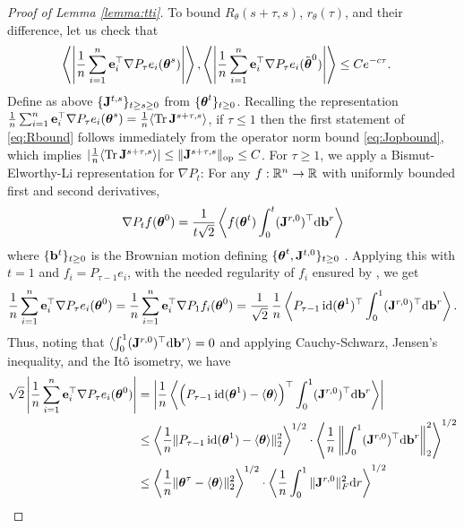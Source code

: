 \begin{proof}[Proof of Lemma \ref{lemma:tti}]
To bound $R_\theta(s+\tau,s)$, $r_\theta(\tau)$, and their difference, let us
check that
\begin{align}
\left\langle \left|\frac{1}{n}\sum_{i=1}^n \mathbf{e}_i^\top \nabla P_\tau
e_i(\boldsymbol{\theta}^s)  \right|\right\rangle,
\left\langle\left|\frac{1}{n}\sum_{i=1}^n \mathbf{e}_i^\top \nabla P_\tau e_i(\tilde
{\boldsymbol{\theta}}^0)\right| \right \rangle
&\leq Ce^{-c\tau}.\label{eq:Rbound}
\end{align}
Define as above $\{\mathbf{J}^{t,s}\}_{t \geq s \geq 0}$ from
$\{\boldsymbol{\theta}^t\}_{t \geq 0}$. Recalling the representation
$\frac{1}{n}\sum_{i=1}^n \mathbf{e}_i^\top \nabla P_\tau e_i(\boldsymbol{\theta}^s)
=\frac{1}{n}\langle \operatorname{Tr} \mathbf{J}^{s+\tau,s} \rangle$,
if $\tau \leq 1$ then the first statement of
\eqref{eq:Rbound} follows immediately from
the operator norm bound \eqref{eq:Jopbound}, which implies
$|\frac{1}{n}\langle \operatorname{Tr} \mathbf{J}^{s+\tau,s} \rangle| \leq \|\mathbf{J}^{s+\tau,s}\|_{\mathrm{op}}
\leq C$. For $\tau \geq 1$, we apply
a Bismut-Elworthy-Li representation for $\nabla P_t$: 
For any $f:\mathbb{R}^n \to \mathbb{R}$ with uniformly bounded first and second derivatives,
\[\nabla P_t f(\boldsymbol{\theta}^0)
=\frac{1}{t \sqrt{2}}\left \langle f(\boldsymbol{\theta}^t)\int_0^t (\mathbf{J}^{r,0})^\top
\mathrm{d} \mathbf{b}^r \right \rangle\]
where $\{\mathbf{b}^t\}_{t \geq 0}$ is the Brownian motion defining
$\{\boldsymbol{\theta}^t,\mathbf{J}^{t,0}\}_{t \geq 0}$ \cite[Lemma 4.2]{fan2025dynamicalII}.
Applying this with $t=1$ and $f_i=P_{\tau-1}e_i$, with the needed regularity of $f_i$ ensured by  \cite[Proposition A.2(c)]{fan2025dynamicalI},  we get
\[\frac{1}{n}\sum_{i=1}^n \mathbf{e}_i^\top \nabla P_\tau e_i(\boldsymbol{\theta}^0)
=\frac{1}{n}\sum_{i=1}^n \mathbf{e}_i^\top \nabla P_1 f_i(\boldsymbol{\theta}^0)
=\frac{1}{\sqrt{2}}\,\frac{1}{n}\left \langle 
P_{\tau-1}\operatorname{id}(\boldsymbol{\theta}^1)^\top\int_0^1 (\mathbf{J}^{r,0})^\top
\mathrm{d} \mathbf{b}^r \right \rangle.\]
Thus, noting that $\langle \int_0^1 (\mathbf{J}^{r,0})^\top \mathrm{d} \mathbf{b}^r \rangle=0$ and
applying Cauchy-Schwarz, Jensen's inequality, and the It\^o isometry, we have
\begin{align}
\sqrt{2} 
\left|\frac{1}{n}\sum_{i=1}^n \e_i^\top \nabla P_\tau e_i(\btheta^0)\right|
&=\left|\frac{1}{n}\left \langle 
\Big(P_{\tau-1}\id(\btheta^1)-\langle \btheta \rangle\Big)^\top\int_0^1
(\J^{r,0})^\top \d \b^r \right \rangle\right|\notag\\
&\leq \left\langle \frac{1}{n}\|P_{\tau-1}\id(\btheta^1)-\langle \btheta
\rangle\|_2^2 \right\rangle^{1/2} \cdot
\left\langle \frac{1}{n}\left\|\int_0^1 (\J^{r,0})^\top \d \b^r\right\|_2^2
\right\rangle^{1/2}\notag\\
&\leq \left\langle \frac{1}{n}\|\btheta^\tau-\langle \btheta
\rangle\|_2^2 \right\rangle^{1/2} \cdot
\left\langle \frac{1}{n}\int_0^1 \|\J^{r,0}\|_F^2\d r \right\rangle^{1/2}\notag\\

\end{align}
\end{proof}
